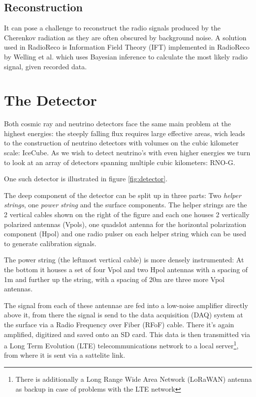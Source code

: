 \documentclass[11pt,a4paper,faculty=we,language=en,doctype=report]{cls/ugent-doc}
\begin{document}
\section{Reconstruction}
It can pose a challenge to reconstruct the radio signals produced by the Cherenkov radiation as they are often obscured by background noise. A solution used in RadioReco is Information Field Theory (IFT) implemented in RadioReco by Welling et al.\cite{Welling_2021} which uses Bayesian inference to calculate the most likely radio signal, given recorded data.
\chapter{The Detector}
Both cosmic ray and neutrino detectors face the same main problem at the highest energies: the steeply falling flux requires large effective areas, wich leads to the construction of neutrino detectors with volumes on the cubic kilometer scale: IceCube. As we wish to detect neutrino's with even higher energies we turn to look at an array of detectors spanning multiple cubic kilometers: RNO-G.

One such detector is illustrated in figure \ref{fig:detector}.

The deep component of the detector can be split up in three parts: Two \textit{helper strings}, one \textit{power string} and the surface components. The helper strings are the 2 vertical cables shown on the right of the figure and each one houses 2 vertically polarized antennas (Vpols), one quadslot antenna for the horizontal polarization component (Hpol) and one radio pulser on each helper string which can be used to generate calibration signals.

The power string (the leftmost vertical cable) is more densely instrumented: At the bottom it houses a set of four Vpol and two Hpol antennas with a spacing of 1m and further up the string, with a spacing of 20m are three more Vpol antennas.

The signal from each of these antennae are fed into a low-noise amplifier directly above it, from there the signal is send to the data acquisition (DAQ) system at the surface via a Radio Frequency over Fiber (RFoF) cable. There it's again amplified, digitized and saved onto an SD card. This data is then transmitted via a Long Term Evolution (LTE) telecommunications network to a local server\footnote{There is additionally a Long Range Wide Area Network (LoRaWAN) antenna as backup in case of problems with the LTE network}, from where it is sent via a sattelite link.
\end{document}

